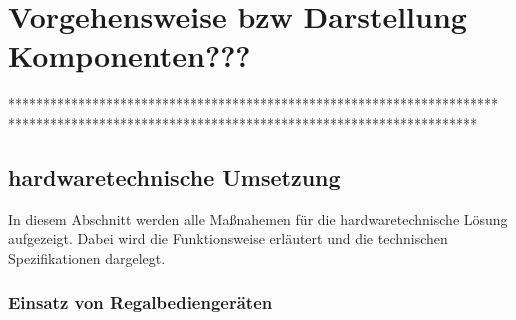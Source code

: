 \chapter{Vorgehensweise bzw Darstellung Komponenten???}
**********************************************************************
*******************************************************************

\section{hardwaretechnische Umsetzung}
In diesem Abschnitt werden alle Maßnahemen für die hardwaretechnische Lösung aufgezeigt. Dabei wird die Funktionsweise erläutert und die technischen Spezifikationen dargelegt.
\subsection{Einsatz von Regalbediengeräten}

